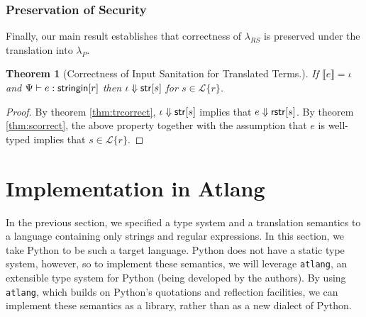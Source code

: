 \documentclass[9pt]{sig-alternate}
\newtheorem{thm}{Theorem}
\theoremstyle{definition}
\newcommand{\Lagr}{\mathcal{L}}
\newcommand{\lang}[1]{\Lagr\{#1\}}
\newcommand{\lambdas}{\lambda_{RS}}
\newcommand{\lambdap}{\lambda_P}
\newcommand{\sistr}[1]{{\sf rstr}[#1]}   \newcommand{\rstr}[1]{{\sf rstr}[#1]} %
\newcommand{\strin}[1]{\sistr{#1}}
\newcommand{\stringin}[1]{{\sf stringin}[#1]}
\renewcommand{\tstr}[1]{{{\sf str}[#1]}}
\newcommand{\sctx}{\Psi} %
\newcommand{\trden}[1]{\llbracket #1 \rrbracket} %
\newcommand{\sreduces}{ \Downarrow }
\begin{document}
\subsubsection{Preservation of Security}

Finally, our main result establishes that correctness of $\lambdas$ is preserved under the translation into $\lambdap$.

\begin{thm}[Correctness of Input Sanitation for Translated Terms.]\label{thm:main}
  If $\trden{e} = \iota$ and $\sctx \vdash e : \stringin{r}$ then $\iota \sreduces \tstr{s}$
  for $s \in \lang{r}$.
\end{thm}
\begin{proof}
  By theorem \ref{thm:trcorrect}, $\iota \sreduces \tstr{s}$ implies that $e \sreduces \strin{s}$.
  By theorem \ref{thm:scorrect}, the above property together with the assumption that $e$ is well-typed implies that $s \in \lang{r}$.
\end{proof}

%
%


\section{Implementation in {Atlang}}\label{atlang}
In the previous section, we specified a type system and a translation semantics to a language containing only strings and regular expressions. In this section, we take Python to be such a target language. Python does not have a static type system, however, so to implement these semantics, we will leverage \verb|atlang|, an extensible type system for Python (being developed by the authors). By using \verb|atlang|, which builds on Python's quotations and reflection facilities, we can implement these semantics as a library, rather than as a new dialect of Python. 
\end{document}
